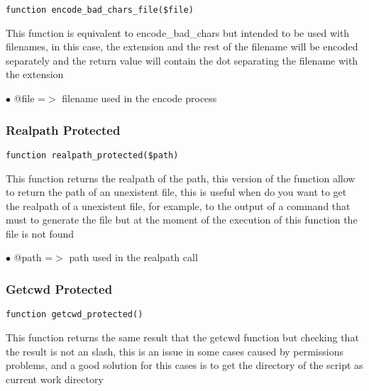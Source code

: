 \documentclass[a4paper]{article}
\begin{document}
\begin{lstlisting}
function encode_bad_chars_file($file)
\end{lstlisting}

This function is equivalent to encode\_bad\_chars but intended to be used
with filenames, in this case, the extension and the rest of the filename
will be encoded separately and the return value will contain the dot
separating the filename with the extension

\begin{compactitem}
\item[\color{myblue}$\bullet$] @file =$>$ filename used in the encode process
\end{compactitem}

\hypertarget{toc137}{}
\subsubsection{Realpath Protected}

\begin{lstlisting}
function realpath_protected($path)
\end{lstlisting}

This function returns the realpath of the path, this version of the function
allow to return the path of an unexistent file, this is useful when do you
want to get the realpath of a unexistent file, for example, to the output of
a command that must to generate the file but at the moment of the execution
of this function the file is not found

\begin{compactitem}
\item[\color{myblue}$\bullet$] @path =$>$ path used in the realpath call
\end{compactitem}

\hypertarget{toc138}{}
\subsubsection{Getcwd Protected}

\begin{lstlisting}
function getcwd_protected()
\end{lstlisting}

This function returns the same result that the getcwd function but checking
that the result is not an slash, this is an issue in some cases caused by
permissions problems, and a good solution for this cases is to get the directory
of the script as current work directory
\end{document}
